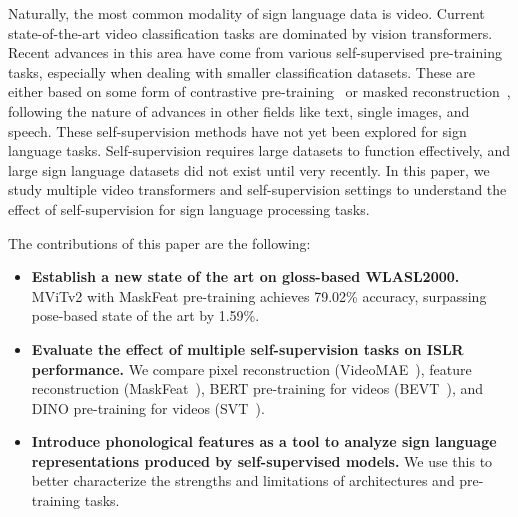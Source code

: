 Naturally, the most common modality of sign language data is video. Current state-of-the-art video classification tasks are dominated by vision transformers. Recent advances in this area have come from various self-supervised pre-training tasks, especially when dealing with smaller classification datasets. These are either based on some form of contrastive pre-training~\cite{pan2021videomoco,Kuang_2021_ICCV,Ranasinghe2021SVT} or masked reconstruction~\cite{Tong2022VideoMAE,Wang2021BEVT,Wei2022MaskFeat}, following the nature of advances in other fields like text, single images, and speech. These self-supervision methods have not yet been explored for sign language tasks. Self-supervision requires large datasets to function effectively, and large sign language datasets did not exist until very recently. In this paper, we study multiple video transformers and self-supervision settings to understand the effect of self-supervision for sign language processing tasks.

The contributions of this paper are the following:
\begin{itemize}
    \item \textbf{Establish a new state of the art on gloss-based WLASL2000.} MViTv2 with MaskFeat pre-training achieves 79.02\% accuracy, surpassing pose-based state of the art by 1.59\%.
    \item \textbf{Evaluate the effect of multiple self-supervision tasks on ISLR performance.} We compare pixel reconstruction (VideoMAE~\cite{Tong2022VideoMAE}), feature reconstruction (MaskFeat~\cite{Wei2022MaskFeat}), BERT pre-training for videos (BEVT~\cite{Wang2021BEVT}), and DINO pre-training for videos (SVT~\cite{Ranasinghe2021SVT}).
    \item \textbf{Introduce phonological features as a tool to analyze sign language representations produced by self-supervised models.} We use this to better characterize the strengths and limitations of architectures and pre-training tasks.
\end{itemize}
